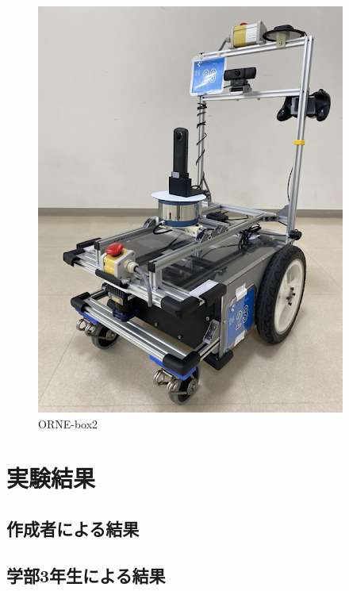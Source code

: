 \begin{figure}[hbtp]
  \centering
 \includegraphics[keepaspectratio, scale=0.3]
      {images/box2.png}
 \caption{ORNE-box2}
 \label{Fig:ORNE-box2}
\end{figure}





\section{実験結果}


\subsection{作成者による結果}


\subsection{学部3年生による結果}